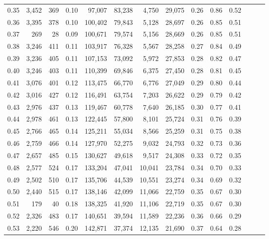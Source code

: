 \begin{tabular}{rrrrrrrrrrrrrr}
0.35 &  3,452 &  369 &  0.10 &   97,007 &   83,238 &   4,750 &  29,075 &  0.26 &  0.86 &      0.52 \\
0.36 &  3,395 &  378 &  0.10 &  100,402 &   79,843 &   5,128 &  28,697 &  0.26 &  0.85 &      0.51 \\
0.37 &    269 &   28 &  0.09 &  100,671 &   79,574 &   5,156 &  28,669 &  0.26 &  0.85 &      0.51 \\
0.38 &  3,246 &  411 &  0.11 &  103,917 &   76,328 &   5,567 &  28,258 &  0.27 &  0.84 &      0.49 \\
0.39 &  3,236 &  405 &  0.11 &  107,153 &   73,092 &   5,972 &  27,853 &  0.28 &  0.82 &      0.47 \\
0.40 &  3,246 &  403 &  0.11 &  110,399 &   69,846 &   6,375 &  27,450 &  0.28 &  0.81 &      0.45 \\
0.41 &  3,076 &  401 &  0.12 &  113,475 &   66,770 &   6,776 &  27,049 &  0.29 &  0.80 &      0.44 \\
0.42 &  3,016 &  427 &  0.12 &  116,491 &   63,754 &   7,203 &  26,622 &  0.29 &  0.79 &      0.42 \\
0.43 &  2,976 &  437 &  0.13 &  119,467 &   60,778 &   7,640 &  26,185 &  0.30 &  0.77 &      0.41 \\
0.44 &  2,978 &  461 &  0.13 &  122,445 &   57,800 &   8,101 &  25,724 &  0.31 &  0.76 &      0.39 \\
0.45 &  2,766 &  465 &  0.14 &  125,211 &   55,034 &   8,566 &  25,259 &  0.31 &  0.75 &      0.38 \\
0.46 &  2,759 &  466 &  0.14 &  127,970 &   52,275 &   9,032 &  24,793 &  0.32 &  0.73 &      0.36 \\
0.47 &  2,657 &  485 &  0.15 &  130,627 &   49,618 &   9,517 &  24,308 &  0.33 &  0.72 &      0.35 \\
0.48 &  2,577 &  524 &  0.17 &  133,204 &   47,041 &  10,041 &  23,784 &  0.34 &  0.70 &      0.33 \\
0.49 &  2,502 &  510 &  0.17 &  135,706 &   44,539 &  10,551 &  23,274 &  0.34 &  0.69 &      0.32 \\
0.50 &  2,440 &  515 &  0.17 &  138,146 &   42,099 &  11,066 &  22,759 &  0.35 &  0.67 &      0.30 \\
0.51 &    179 &   40 &  0.18 &  138,325 &   41,920 &  11,106 &  22,719 &  0.35 &  0.67 &      0.30 \\
0.52 &  2,326 &  483 &  0.17 &  140,651 &   39,594 &  11,589 &  22,236 &  0.36 &  0.66 &      0.29 \\
0.53 &  2,220 &  546 &  0.20 &  142,871 &   37,374 &  12,135 &  21,690 &  0.37 &  0.64 &      0.28 \\

\end{tabular}
